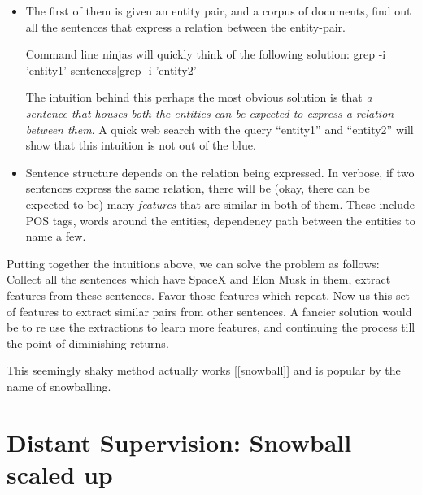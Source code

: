 \documentclass[a4paper,10pt]{article}
\begin{document}
\begin{itemize}
 
\item The first of them is given an entity pair, and a corpus of documents, find out all the sentences that
express a relation between the entity-pair.

Command line ninjas will quickly think of the following solution:
grep -i 'entity1' sentences|grep -i 'entity2'

The intuition behind this perhaps the most obvious solution is that \emph{a sentence
that houses both the entities can be expected to express a relation between them}.
A quick web search with the query ``entity1'' and ``entity2'' will show that this 
intuition is not out of the blue.

\item Sentence structure depends on the relation being expressed.
In verbose, if two sentences express the same relation, there will be (okay, there can be expected to be)
many \emph{features} that are similar in both of them. These include POS tags, words around the entities,
dependency path between the entities to name a few.

\end{itemize}
Putting together the intuitions above, we can solve the problem as follows:
Collect all the sentences which have SpaceX and Elon Musk in them, extract features 
from these sentences. Favor those features which repeat.
Now us this set of features to extract similar pairs from other sentences.
A fancier solution would be to re use the extractions to learn more features, and continuing the process 
till the point of diminishing returns.

This seemingly shaky method actually works [\ref{snowball}] and is popular by the name of snowballing.

\section{Distant Supervision: Snowball scaled up}
\end{document}
